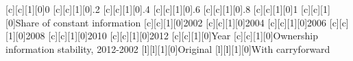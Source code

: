 [c][c][1][0]{\normalsize 0}
[c][c][1][0]{\normalsize .2}
[c][c][1][0]{\normalsize .4}
[c][c][1][0]{\normalsize .6}
[c][c][1][0]{\normalsize .8}
[c][c][1][0]{\normalsize 1}
[c][c][1][0]{\normalsize Share of constant information}
[c][c][1][0]{\normalsize 2002}
[c][c][1][0]{\normalsize 2004}
[c][c][1][0]{\normalsize 2006}
[c][c][1][0]{\normalsize 2008}
[c][c][1][0]{\normalsize 2010}
[c][c][1][0]{\normalsize 2012}
[c][c][1][0]{\normalsize Year}
[c][c][1][0]{\normalsize Ownership information stability, 2012-2002}
[l][l][1][0]{\normalsize Original}
[l][l][1][0]{\normalsize With carryforward}
